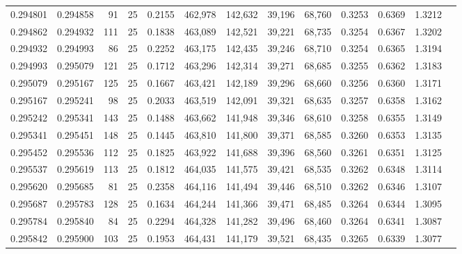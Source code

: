 \begin{tabular}{rrrrrrrrrrrrr}
0.294801 & 0.294858 &    91 &  25 &                                     0.2155 & 462,978 & 142,632 &  39,196 &  68,760 & 0.3253 & 0.6369 & 1.3212 \\
0.294862 & 0.294932 &   111 &  25 &                                     0.1838 & 463,089 & 142,521 &  39,221 &  68,735 & 0.3254 & 0.6367 & 1.3202 \\
0.294932 & 0.294993 &    86 &  25 &                                     0.2252 & 463,175 & 142,435 &  39,246 &  68,710 & 0.3254 & 0.6365 & 1.3194 \\
0.294993 & 0.295079 &   121 &  25 &                                     0.1712 & 463,296 & 142,314 &  39,271 &  68,685 & 0.3255 & 0.6362 & 1.3183 \\
0.295079 & 0.295167 &   125 &  25 &                                     0.1667 & 463,421 & 142,189 &  39,296 &  68,660 & 0.3256 & 0.6360 & 1.3171 \\
0.295167 & 0.295241 &    98 &  25 &                                     0.2033 & 463,519 & 142,091 &  39,321 &  68,635 & 0.3257 & 0.6358 & 1.3162 \\
0.295242 & 0.295341 &   143 &  25 &                                     0.1488 & 463,662 & 141,948 &  39,346 &  68,610 & 0.3258 & 0.6355 & 1.3149 \\
0.295341 & 0.295451 &   148 &  25 &                                     0.1445 & 463,810 & 141,800 &  39,371 &  68,585 & 0.3260 & 0.6353 & 1.3135 \\
0.295452 & 0.295536 &   112 &  25 &                                     0.1825 & 463,922 & 141,688 &  39,396 &  68,560 & 0.3261 & 0.6351 & 1.3125 \\
0.295537 & 0.295619 &   113 &  25 &                                     0.1812 & 464,035 & 141,575 &  39,421 &  68,535 & 0.3262 & 0.6348 & 1.3114 \\
0.295620 & 0.295685 &    81 &  25 &                                     0.2358 & 464,116 & 141,494 &  39,446 &  68,510 & 0.3262 & 0.6346 & 1.3107 \\
0.295687 & 0.295783 &   128 &  25 &                                     0.1634 & 464,244 & 141,366 &  39,471 &  68,485 & 0.3264 & 0.6344 & 1.3095 \\
0.295784 & 0.295840 &    84 &  25 &                                     0.2294 & 464,328 & 141,282 &  39,496 &  68,460 & 0.3264 & 0.6341 & 1.3087 \\
0.295842 & 0.295900 &   103 &  25 &                                     0.1953 & 464,431 & 141,179 &  39,521 &  68,435 & 0.3265 & 0.6339 & 1.3077 \\

\end{tabular}
